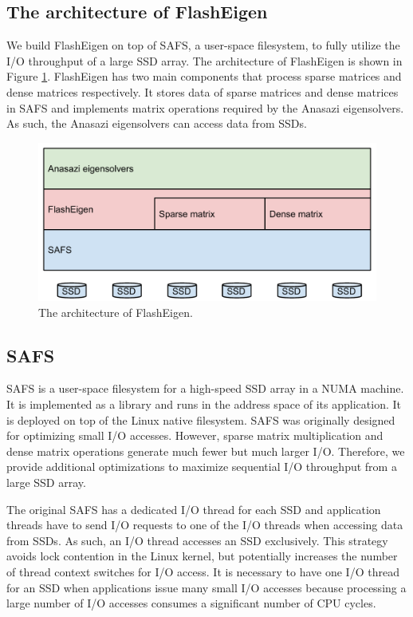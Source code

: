 \subsection{The architecture of FlashEigen}

We build FlashEigen on top of SAFS, a user-space filesystem, to fully utilize
the I/O throughput of a large SSD array. The architecture of FlashEigen is shown
in Figure \ref{arch}. FlashEigen has two main components that process sparse
matrices and dense matrices respectively. It stores data of sparse matrices
and dense matrices
in SAFS and implements matrix operations required by the Anasazi eigensolvers.
As such, the Anasazi eigensolvers can access data from SSDs.

\begin{figure}
\centering
\includegraphics[scale=0.4]{./architecture.pdf}
\vspace{-5pt}
\caption{The architecture of FlashEigen.}
\vspace{-5pt}
\label{arch}
\end{figure}

\subsection{SAFS}

SAFS \cite{safs} is a user-space filesystem for a high-speed SSD array in
a NUMA machine. It is implemented as a library and runs in the address space
of its application. It is deployed on top of the Linux native filesystem.
SAFS was originally designed for optimizing small I/O accesses. However,
sparse matrix multiplication and dense matrix operations
generate much fewer but much larger I/O. Therefore, we provide additional
optimizations to maximize sequential I/O throughput from a large SSD array.

The original SAFS has a dedicated I/O thread for each SSD and application threads
have to send I/O requests to one of the I/O threads when accessing data from SSDs.
As such, an I/O thread accesses an SSD exclusively. This strategy avoids lock
contention in the Linux kernel, but potentially increases the number of thread
context switches for I/O access. It is necessary to have one I/O thread for
an SSD when applications issue many small I/O accesses because processing
a large number of I/O accesses consumes a significant number of CPU cycles.


